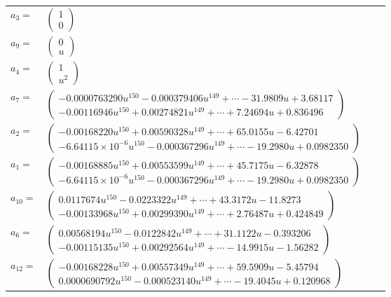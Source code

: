 \documentclass[1p]{elsarticle_modified}
\theoremstyle{definition}
\begin{document}
\begin{tabular}{m{7pt} m{180pt} m{7pt} m{180pt} }
\flushright $a_{3}=$&$\begin{pmatrix}1\\0\end{pmatrix}$ \\
\flushright $a_{9}=$&$\begin{pmatrix}0\\u\end{pmatrix}$ \\
\flushright $a_{4}=$&$\begin{pmatrix}1\\u^2\end{pmatrix}$ \\
\flushright $a_{7}=$&$\begin{pmatrix}-0.0000763290 u^{150}-0.000379406 u^{149}+\cdots-31.9809 u+3.68117\\-0.00116946 u^{150}+0.00274821 u^{149}+\cdots+7.24694 u+0.836496\end{pmatrix}$ \\
\flushright $a_{2}=$&$\begin{pmatrix}-0.00168220 u^{150}+0.00590328 u^{149}+\cdots+65.0155 u-6.42701\\-6.64115\times10^{-6} u^{150}-0.000367296 u^{149}+\cdots-19.2980 u+0.0982350\end{pmatrix}$ \\
\flushright $a_{1}=$&$\begin{pmatrix}-0.00168885 u^{150}+0.00553599 u^{149}+\cdots+45.7175 u-6.32878\\-6.64115\times10^{-6} u^{150}-0.000367296 u^{149}+\cdots-19.2980 u+0.0982350\end{pmatrix}$ \\
\flushright $a_{10}=$&$\begin{pmatrix}0.0117674 u^{150}-0.0223322 u^{149}+\cdots+43.3172 u-11.8273\\-0.00133968 u^{150}+0.00299390 u^{149}+\cdots+2.76487 u+0.424849\end{pmatrix}$ \\
\flushright $a_{6}=$&$\begin{pmatrix}0.00568194 u^{150}-0.0122842 u^{149}+\cdots+31.1122 u-0.393206\\-0.00115135 u^{150}+0.00292564 u^{149}+\cdots-14.9915 u-1.56282\end{pmatrix}$ \\
\flushright $a_{12}=$&$\begin{pmatrix}-0.00168228 u^{150}+0.00557349 u^{149}+\cdots+59.5909 u-5.45794\\0.0000690792 u^{150}-0.000523140 u^{149}+\cdots-19.4045 u+0.120968\end{pmatrix}$ \\

\end{tabular}
\end{document}
